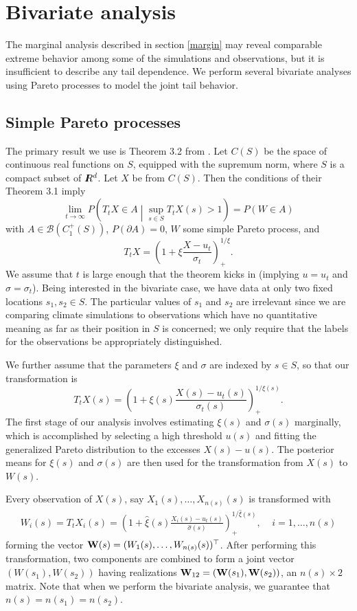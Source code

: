 \section{Bivariate analysis}
\label{bivariate}

The marginal analysis described in section \ref{margin} may reveal comparable extreme behavior among  some of the simulations and observations, but it is insufficient to describe any tail dependence. We perform several bivariate analyses using Pareto processes to model the joint tail behavior.

\subsection{Simple Pareto processes}

The primary result we use is Theorem 3.2 from \cite{ferreira2014generalized}. Let $C(S)$ be the space of continuous real functions on $S$, equipped with the supremum norm, where $S$ is a compact subset of $I\hspace{-4.4pt}R^d$. Let $X$ be from $C(S)$. Then the conditions of their Theorem 3.1 imply
\[ \lim_{t\rightarrow\infty} P\left(T_t X \in A \middle| \sup_{s\in S} T_t X(s) > 1\right) = P(W \in A) \]
with $A \in \mathcal{B}(C_1^+(S))$, $P(\partial A)=0$, $W$ some simple Pareto process, and
\[ T_t X = \left(1 + \xi \frac{X - u_t}{\sigma_t}\right)_+^{1/\xi}. \]
We assume that $t$ is large enough that the theorem kicks in (implying $u=u_t$ and $\sigma=\sigma_t$). Being interested in the bivariate case, we have data at only two fixed locations $s_1,s_2\in S$. The particular values of $s_1$ and $s_2$ are irrelevant since we are comparing climate simulations to observations which have no quantitative meaning as far as their position in $S$ is concerned; we only require that the labels for the observations be appropriately distinguished.

We further assume that the parameters $\xi$ and $\sigma$ are indexed by $s\in S$, so that our transformation is
\[ T_t X(s) = \left(1 + \xi(s) \frac{X(s) - u_t(s)}{\sigma_t(s)}\right)_+^{1/\xi(s)}. \]
The first stage of our analysis involves estimating $\xi(s)$ and $\sigma(s)$ marginally, which is accomplished by selecting a high threshold $u(s)$ and fitting the generalized Pareto distribution to the excesses $X(s)-u(s)$. The posterior means for $\xi(s)$ and $\sigma(s)$ are then used for the transformation from $X(s)$ to $W(s)$.

Every observation of $X(s)$, say $X_1(s),\ldots,X_{n(s)}(s)$ is transformed with
\begin{align}
W_i(s) = T_t X_i(s) = \left(1 + \hat{\xi}(s) \frac{X_i(s) - u_t(s)}{\hat{\sigma}(s)}\right)_+^{1/\hat{\xi}(s)},~~~~~i=1,\ldots,n(s) \label{transform}
\end{align}
forming the vector $\mathbf{\bm{W}}(s)=(W_1(s),\ldots,W_{n(s)}(s))^\top$. After performing this transformation, two components are combined to form a joint vector $(W(s_1), W(s_2))$ having realizations $\mathbf{\bm{W}}_{12}=(\mathbf{\bm{W}}(s_1), \mathbf{\bm{W}}(s_2))$, an $n(s)\times 2$ matrix. Note that when we perform the bivariate analysis, we guarantee that $n(s)=n(s_1)=n(s_2)$.

